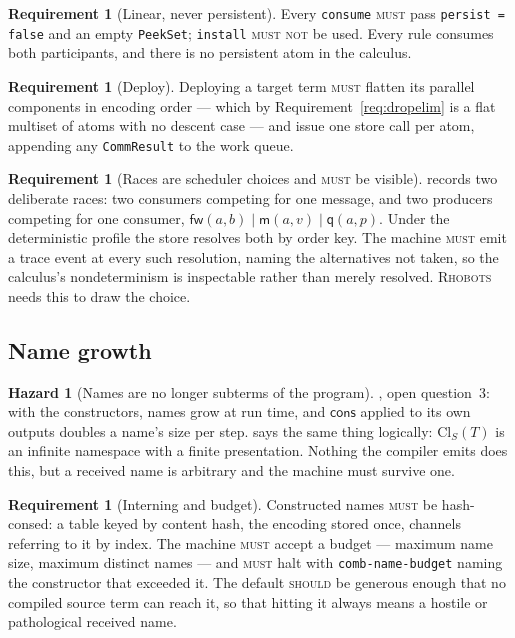 \documentclass[11pt,a4paper]{article}
\newcommand{\code}[1]{\texttt{#1}}
\newcommand{\Rhobots}{\textsc{Rhobots}}
\newcommand{\MUST}{\textsc{must}}
\newcommand{\MUSTNOT}{\textsc{must not}}
\newcommand{\SHOULD}{\textsc{should}}
\newcommand{\mm}{\mathsf{m}}
\newcommand{\fw}{\mathsf{fw}}
\newcommand{\qq}{\mathsf{q}}
\newcommand{\cons}{\mathsf{cons}}
\newcommand{\Cl}{\mathrm{Cl}}
\theoremstyle{definition}
\newtheorem{requirement}[definition]{Requirement}
\newtheorem{hazard}[definition]{Hazard}
\theoremstyle{plain}
\begin{document}
\begin{requirement}[Linear, never persistent]\label{req:linear}
Every \code{consume} \MUST{} pass \code{persist = false} and an empty
\code{PeekSet}; \code{install} \MUSTNOT{} be used. Every rule consumes both
participants, and there is no persistent atom in the calculus.
\end{requirement}

\begin{requirement}[Deploy]\label{req:deploy}
Deploying a target term \MUST{} flatten its parallel components in encoding
order --- which by Requirement~\ref{req:dropelim} is a flat multiset of atoms
with no descent case --- and issue one store call per atom, appending any
\code{CommResult} to the work queue.
\end{requirement}

\begin{requirement}[Races are scheduler choices and \MUST{} be visible]
\label{req:races}
\cite[\S3.3]{draft3} records two deliberate races: two consumers competing for
one message, and two producers competing for one consumer,
$\fw(a,b) \mid \mm(a,v) \mid \qq(a,p)$. Under the deterministic profile the
store resolves both by order key. The machine \MUST{} emit a trace event at
every such resolution, naming the alternatives not taken, so the calculus's
nondeterminism is inspectable rather than merely resolved. \Rhobots{} needs
this to draw the choice.
\end{requirement}

\subsection{Name growth}

\begin{hazard}[Names are no longer subterms of the program]\label{haz:growth}
\cite[\S12]{draft3}, open question~3: with the constructors, names grow at run
time, and $\cons$ applied to its own outputs doubles a name's size per step.
\cite[\S7]{logic} says the same thing logically: $\Cl_{S}(T)$ is an infinite
namespace with a finite presentation. Nothing the compiler emits does this,
but a received name is arbitrary and the machine must survive one.
\end{hazard}

\begin{requirement}[Interning and budget]\label{req:intern}
Constructed names \MUST{} be hash-consed: a table keyed by content hash, the
encoding stored once, channels referring to it by index. The machine \MUST{}
accept a budget --- maximum name size, maximum distinct names --- and \MUST{}
halt with \code{comb-name-budget} naming the constructor that exceeded it. The
default \SHOULD{} be generous enough that no compiled source term can reach
it, so that hitting it always means a hostile or pathological received name.
\end{requirement}
\end{document}
